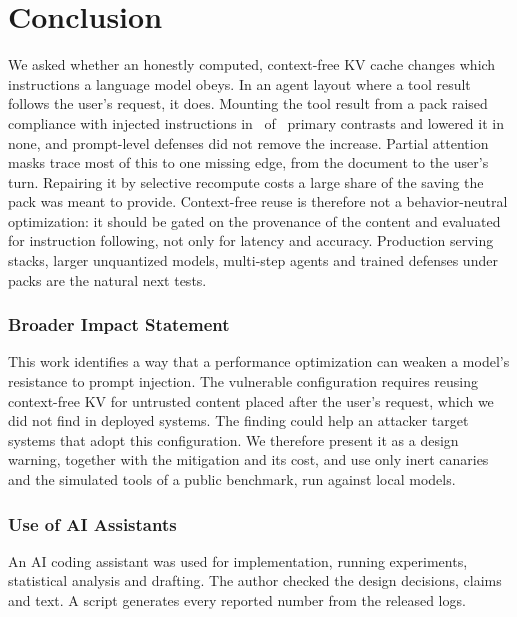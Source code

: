 \documentclass[10pt]{article}
\begin{document}
\section{Conclusion}\label{sec:conclusion}
We asked whether an honestly computed, context-free KV cache changes which instructions a language model obeys. In an agent layout
where a tool result follows the user's request, it does. Mounting the tool result from a pack raised compliance with injected
instructions in \PrimaryPos\ of \PrimaryN\ primary contrasts and lowered it in none, and prompt-level defenses did not remove the
increase. Partial attention masks trace most of this to one missing edge, from the document to the user's turn. Repairing it by
selective recompute costs a large share of the saving the pack was meant to provide. Context-free reuse is therefore not a
behavior-neutral optimization: it should be gated on the provenance of the content and evaluated for instruction following, not only
for latency and accuracy. Production serving stacks, larger unquantized models, multi-step agents and trained defenses under packs
are the natural next tests.

\subsubsection*{Broader Impact Statement}
This work identifies a way that a performance optimization can weaken a model's resistance to prompt injection. The vulnerable
configuration requires reusing context-free KV for untrusted content placed after the user's request, which we did not find in
deployed systems. The finding could help an attacker target systems that adopt this configuration. We therefore present it as a
design warning, together with the mitigation and its cost, and use only inert canaries and the simulated tools of a public benchmark,
run against local models.

\subsubsection*{Use of AI Assistants}
An AI coding assistant was used for implementation, running experiments, statistical analysis and drafting. The author checked
the design decisions, claims and text. A script generates every reported number from the released logs.




\appendix
\end{document}
